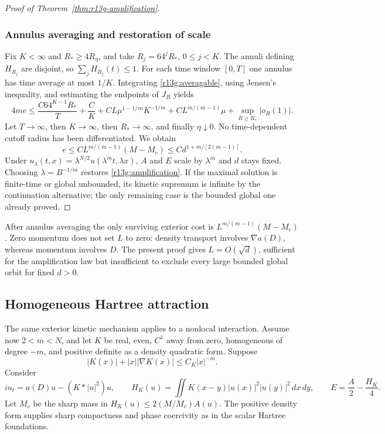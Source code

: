 \begin{proof}[Proof of Theorem~\ref{thm:r13g-amplification}]
\subsubsection*{Annulus averaging and restoration of scale}
Fix $K<\infty$ and $R_*\ge4R_\eta$, and take
$R_j=64^jR_*$, $0\le j<K$. The annuli defining $H_{R_j}$ are
disjoint, so $\sum_jH_{R_j}(t)\le1$. For each time window $[0,T]$
one annulus has time average at most $1/K$. Integrating
\eqref{r13g:averagable}, using Jensen's inequality, and estimating
the endpoints of $J_R$ yields
\[
 4me\le \frac{C64^{K-1}R_*}{T}+\frac CK
  +CL\mu^{1-1/m}K^{-1/m}+CL^{m/(m-1)}\mu
  +\sup_{R\ge R_*}|o_R(1)|.
\]
Let $T\to\infty$, then $K\to\infty$, then $R_*\to\infty$,
and finally $\eta\downarrow0$. No time-dependent cutoff radius
has been differentiated. We obtain
\[
 e\le CL^{m/(m-1)}(M-M_c)
 \le C d^{1+m/[2(m-1)]}.
\]
Under $u_\lambda(t,x)=\lambda^{N/2}u(\lambda^m t,\lambda x)$,
$A$ and $E$ scale by $\lambda^m$ and $d$ stays fixed. Choosing
$\lambda=B^{-1/m}$ restores \eqref{r13g:amplification}.
If the maximal solution is finite-time or global unbounded, its
kinetic supremum is infinite by the continuation alternative; the
only remaining case is the bounded global one already proved.
\end{proof}

\begin{remark}
After annulus averaging the only surviving exterior cost is
$L^{m/(m-1)}(M-M_c)$. Zero momentum does not set $L$ to zero:
density transport involves $\nabla a(D)$, whereas momentum involves
$D$. The present proof gives $L=O(\sqrt d)$, sufficient for the
amplification law but insufficient to exclude every large bounded
global orbit for fixed $d>0$.
\end{remark}

\subsection{Homogeneous Hartree attraction}
\label{subsec:r13g-hartree}

The same exterior kinetic mechanism applies to a nonlocal interaction.
Assume now $2<m<N$, and let $K$ be real, even, $C^1$ away from zero,
homogeneous of degree $-m$, and positive definite as a density quadratic
form. Suppose
\[
 |K(x)|+|x||\nabla K(x)|\le C_K|x|^{-m}.
\]
Consider
\[
 iu_t=a(D)u-(K*|u|^2)u,\qquad
 H_K(u)=\iint K(x-y)|u(x)|^2|u(y)|^2\,dx\,dy,
 \qquad E=\frac A2-\frac{H_K}4.
\]
Let $M_c$ be the sharp mass in $H_K(u)\le2(M/M_c)A(u)$.
The positive density form supplies sharp compactness and phase
coercivity as in the scalar Hartree foundations.

